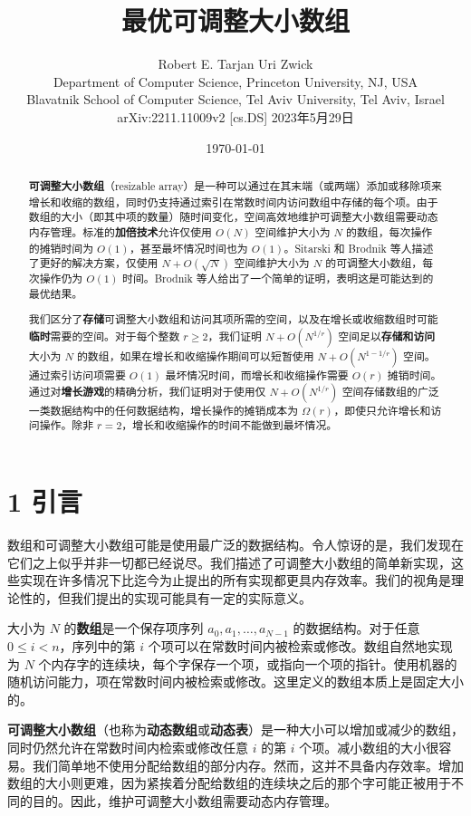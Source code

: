 \documentclass[12pt,a4paper]{ctexart}
\title{最优可调整大小数组}
\author{Robert E. Tarjan \quad Uri Zwick \\
Department of Computer Science, Princeton University, NJ, USA \\
Blavatnik School of Computer Science, Tel Aviv University, Tel Aviv, Israel \\
arXiv:2211.11009v2 [cs.DS] 2023年5月29日}
\date{\today}
\theoremstyle{remark}
\begin{document}
\maketitle

\begin{abstract}
\textbf{可调整大小数组}（resizable array）是一种可以通过在其末端（或两端）添加或移除项来增长和收缩的数组，同时仍支持通过索引在常数时间内访问数组中存储的每个项。由于数组的大小（即其中项的数量）随时间变化，空间高效地维护可调整大小数组需要动态内存管理。标准的\textbf{加倍技术}允许仅使用 $O(N)$ 空间维护大小为 $N$ 的数组，每次操作的摊销时间为 $O(1)$，甚至最坏情况时间也为 $O(1)$。Sitarski 和 Brodnik 等人描述了更好的解决方案，仅使用 $N+O(\sqrt{N})$ 空间维护大小为 $N$ 的可调整大小数组，每次操作仍为 $O(1)$ 时间。Brodnik 等人给出了一个简单的证明，表明这是可能达到的最优结果。

我们区分了\textbf{存储}可调整大小数组和访问其项所需的空间，以及在增长或收缩数组时可能\textbf{临时}需要的空间。对于每个整数 $r\geq 2$，我们证明 $N+O(N^{1/r})$ 空间足以\textbf{存储和访问}大小为 $N$ 的数组，如果在增长和收缩操作期间可以短暂使用 $N+O(N^{1-1/r})$ 空间。通过索引访问项需要 $O(1)$ 最坏情况时间，而增长和收缩操作需要 $O(r)$ 摊销时间。通过对\textbf{增长游戏}的精确分析，我们证明对于使用仅 $N+O(N^{1/r})$ 空间存储数组的广泛一类数据结构中的任何数据结构，增长操作的摊销成本为 $\Omega(r)$，即使只允许增长和访问操作。除非 $r=2$，增长和收缩操作的时间不能做到最坏情况。
\end{abstract}

\section{1 引言}

数组和可调整大小数组可能是使用最广泛的数据结构。令人惊讶的是，我们发现在它们之上似乎并非一切都已经说尽。我们描述了可调整大小数组的简单新实现，这些实现在许多情况下比迄今为止提出的所有实现都更具内存效率。我们的视角是理论性的，但我们提出的实现可能具有一定的实际意义。

大小为 $N$ 的\textbf{数组}是一个保存项序列 $a_0,a_1,\ldots,a_{N-1}$ 的数据结构。对于任意 $0\leq i<n$，序列中的第 $i$ 个项可以在常数时间内被检索或修改。数组自然地实现为 $N$ 个内存字的连续块，每个字保存一个项，或指向一个项的指针。使用机器的随机访问能力，项在常数时间内被检索或修改。这里定义的数组本质上是固定大小的。

\textbf{可调整大小数组}（也称为\textbf{动态数组}或\textbf{动态表}）是一种大小可以增加或减少的数组，同时仍然允许在常数时间内检索或修改任意 $i$ 的第 $i$ 个项。减小数组的大小很容易。我们简单地不使用分配给数组的部分内存。然而，这并不具备内存效率。增加数组的大小则更难，因为紧挨着分配给数组的连续块之后的那个字可能正被用于不同的目的。因此，维护可调整大小数组需要动态内存管理。
\end{document}
